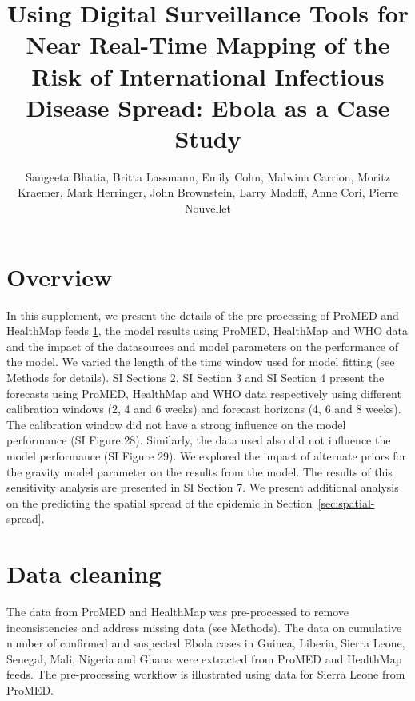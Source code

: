 \documentclass[9pt,twoside,lineno]{pnas-new}
\title{Using Digital Surveillance Tools for Near Real-Time Mapping of
  the Risk of International Infectious Disease Spread: Ebola as a Case
  Study}
\author{Sangeeta Bhatia, Britta Lassmann, Emily Cohn, Malwina Carrion,
Moritz Kraemer, Mark Herringer, John Brownstein, Larry Madoff, Anne
Cori, Pierre Nouvellet}
\begin{document}
\maketitle

\SItext

 
\tableofcontents


\section*{Overview}\label{overview}

In this supplement, we present the details of the pre-processing of
ProMED and HealthMap feeds \ref{sec:data-cleaning}, 
the model results using ProMED,
HealthMap and WHO data and the impact of the datasources and model
parameters on the performance of the model. We varied the length of the
time window used for model fitting (see Methods for details). SI Sections
2, SI Section 3 and SI Section 4 present the forecasts using ProMED,
HealthMap and WHO data respectively using different calibration windows (2, 4
and 6 weeks) and forecast horizons (4, 6 and 8 weeks). The calibration window
did not have a strong influence on the model performance (SI Figure 28).
Similarly, the data used also did not influence the model performance
(SI Figure 29). We explored the impact of alternate priors for the
gravity model parameter on the results from the model. The results of
this sensitivity analysis are presented in SI Section 7. We present
additional analysis on the predicting the spatial spread of the
epidemic in Section~\ref{sec:spatial-spread}.


\section{Data cleaning}\label{sec:data-cleaning}

The data from ProMED and HealthMap was pre-processed to remove
inconsistencies and address missing data (see Methods). The data on
cumulative number of confirmed and suspected Ebola cases in Guinea,
Liberia, Sierra Leone, Senegal, Mali, Nigeria and Ghana were extracted
from ProMED and HealthMap feeds. The pre-processing workflow is 
illustrated using data for Sierra Leone from ProMED.
\end{document}
